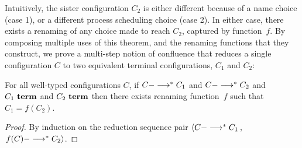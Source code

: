 Intuitively, the sister configuration $C_2$ is either different
because of a name choice (case 1), or a different process scheduling choice
(case 2).  In either case, there exists a renaming of any choice made
to reach $C_2$, captured by function~$f$.
%
By composing multiple uses of this theorem, and the renaming functions
that they construct, we prove a multi-step notion of confluence that 
reduces a single configuration $C$ to two equivalent terminal configurations,
 $C_1$ and $C_2$:

\begin{theorem}
For all well-typed configurations $C$,
%
 if $C --->^\ast C_1$ 
and $C --->^\ast C_2$ 
and $C_1~\textbf{term}$
and $C_2~\textbf{term}$
then 
there exists renaming function~$f$ 
such that $C_1 = f(C_2)$.
\begin{proof}
    By induction on the reduction sequence pair
  $\left< C --->^\ast C_1\right.$, 
  $\left.f(C) --->^\ast C_2 \right>$.
\end{proof}
\end{theorem}
